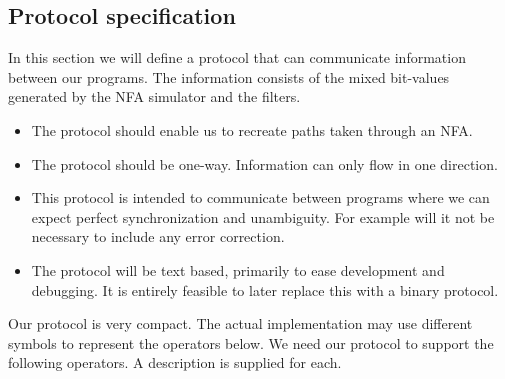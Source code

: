 \subsection{Protocol specification}
\label{sec:protocol_spec}


In this section we will define a protocol that can communicate
information between our programs. The information consists of the
mixed bit-values generated by the NFA simulator and the filters.

\begin{itemize}
\item The protocol should enable us to recreate paths taken through an
  NFA.
\item The protocol should be one-way. Information can only flow in one
  direction.
\item This protocol is intended to communicate between programs where
  we can expect perfect synchronization and unambiguity. For example
  will it not be necessary to include any error correction. 
\item The protocol will be text based, primarily to ease development
  and debugging. It is entirely feasible to later replace this with a
  binary protocol.
\end{itemize}

Our protocol is very compact. The actual implementation may use
different symbols to represent the operators below. We need our
protocol to support the following operators. A description is supplied
for each.

